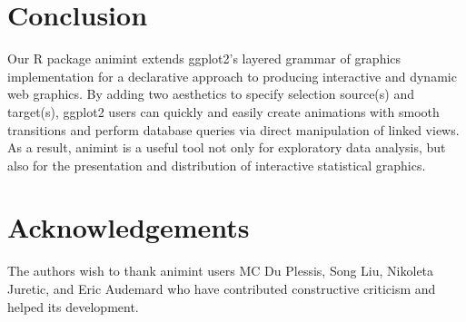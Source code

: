 \documentclass[journal]{vgtc}\usepackage[]{graphicx}\usepackage[]{color}
\begin{document}
\section{Conclusion}

Our R package animint extends ggplot2's layered grammar of graphics 
implementation for a declarative approach to producing interactive
and dynamic web graphics. By adding two aesthetics to specify selection
source(s) and target(s), ggplot2 users can quickly and easily create 
animations with smooth transitions and perform database queries via direct
manipulation of linked views. As a result, animint is a useful tool 
not only for exploratory data analysis, but also for the presentation
and distribution of interactive statistical graphics.

\section*{Acknowledgements}

The authors wish to thank animint users MC Du Plessis, Song Liu,
Nikoleta Juretic, and Eric Audemard
who have contributed constructive criticism and helped its development.

%



\end{document}
